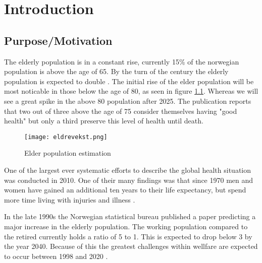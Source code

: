 
\chapter{Introduction} %

\label{Chapter1} %


\section{Purpose/Motivation}
The elderly population is in a constant rise, currently 15\% of the norwegian population is above the age of 65. By the turn of the century the elderly population is expected to double \cite{elder}. The initial rise of the elder population will be most noticable in those below the age of 80, as seen in figure \ref{fig:elderPopulation}.
 Whereas we will see a great spike in the above 80 population after 2025. 
 The publication reports that two out of three above the age of 75 consider themselves having "good health" but only a third preserve this level of health until death.

\begin{figure}[h!]
	\centering
		\label{fig:elderPopulation}
		\texttt{[image: eldrevekst.png]}
		\caption{\footnotesize Elder population estimation \cite{elder}}
\end{figure}
One of the largest ever systematic efforts to describe the global health situation was conducted in 2010. One of their many findings was that since 1970 men and women have gained an additional ten years to their life expectancy, but spend more time living with injuries and illness \cite{globalBurden}. %

In the late 1990s the Norwegian statistical bureau published a paper predicting a major increase in the elderly population. The working population compared to the retired currently holds a ratio of 5 to 1. 
This is expected to drop below 3 by the year 2040. Because of this the greatest challenges within wellfare are expected to occur between 1998 and 2020 \cite{eldreEksplosjon}. 

